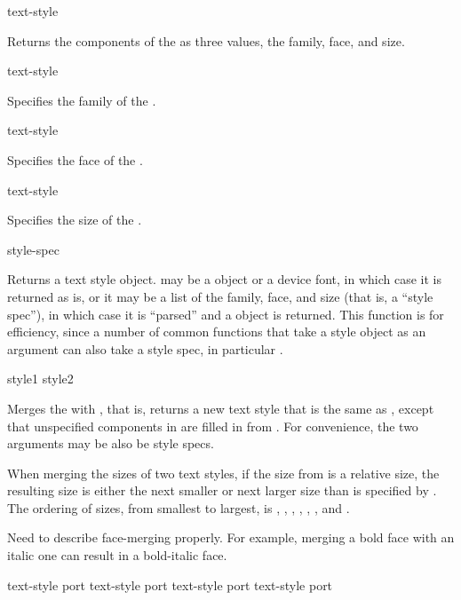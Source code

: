  {text-style}

Returns the components of the   as three
values, the family, face, and size.

 {text-style}

Specifies the family of the  .

 {text-style}

Specifies the face of the  .

 {text-style}

Specifies the size of the  .


 {style-spec}  

Returns a text style object.   may be a  object
or a device font, in which case it is returned as is, or it may be a list of the
family, face, and size (that is, a ``style spec''), in which case it is
``parsed'' and a  object is returned.  This function is for
efficiency, since a number of common functions that take a style object as an
argument can also take a style spec, in particular .


 {style1 style2}

Merges the   with , that is, returns a
new text style that is the same as , except that unspecified
components in  are filled in from .  For convenience,
the two arguments may be also be style specs.

When merging the sizes of two text styles, if the size from  is a
relative size, the resulting size is either the next smaller or next larger size
than is specified by .  The ordering of sizes, from smallest to
largest, is , , , ,
, , and .

 {Need to describe face-merging properly.  For example, merging a
bold face with an italic one can result in a bold-italic face.}


  {text-style port} 
 {text-style port}
  {text-style port}
   {text-style port}


